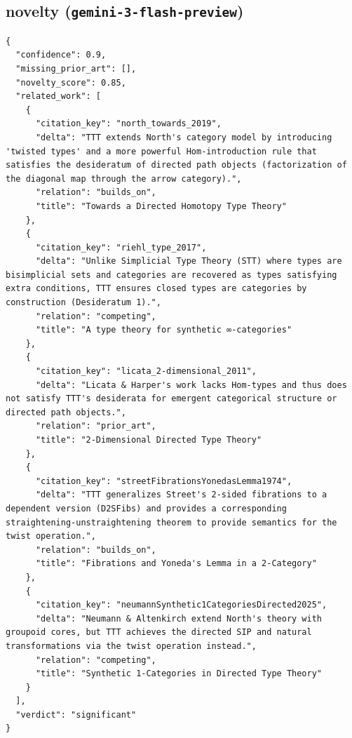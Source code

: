 \documentclass[11pt]{article}
\begin{document}
\subsection*{novelty (\texttt{gemini-3-flash-preview})}
\begin{verbatim}
{
  "confidence": 0.9,
  "missing_prior_art": [],
  "novelty_score": 0.85,
  "related_work": [
    {
      "citation_key": "north_towards_2019",
      "delta": "TTT extends North's category model by introducing 'twisted types' and a more powerful Hom-introduction rule that satisfies the desideratum of directed path objects (factorization of the diagonal map through the arrow category).",
      "relation": "builds_on",
      "title": "Towards a Directed Homotopy Type Theory"
    },
    {
      "citation_key": "riehl_type_2017",
      "delta": "Unlike Simplicial Type Theory (STT) where types are bisimplicial sets and categories are recovered as types satisfying extra conditions, TTT ensures closed types are categories by construction (Desideratum 1).",
      "relation": "competing",
      "title": "A type theory for synthetic ∞-categories"
    },
    {
      "citation_key": "licata_2-dimensional_2011",
      "delta": "Licata & Harper's work lacks Hom-types and thus does not satisfy TTT's desiderata for emergent categorical structure or directed path objects.",
      "relation": "prior_art",
      "title": "2-Dimensional Directed Type Theory"
    },
    {
      "citation_key": "streetFibrationsYonedasLemma1974",
      "delta": "TTT generalizes Street's 2-sided fibrations to a dependent version (D2SFibs) and provides a corresponding straightening-unstraightening theorem to provide semantics for the twist operation.",
      "relation": "builds_on",
      "title": "Fibrations and Yoneda's Lemma in a 2-Category"
    },
    {
      "citation_key": "neumannSynthetic1CategoriesDirected2025",
      "delta": "Neumann & Altenkirch extend North's theory with groupoid cores, but TTT achieves the directed SIP and natural transformations via the twist operation instead.",
      "relation": "competing",
      "title": "Synthetic 1-Categories in Directed Type Theory"
    }
  ],
  "verdict": "significant"
}
\end{verbatim}
\end{document}
